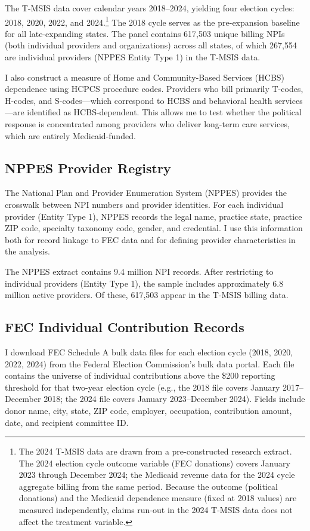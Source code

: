 \documentclass[12pt]{article}
\begin{document}
The T-MSIS data cover calendar years 2018--2024, yielding four election cycles: 2018, 2020, 2022, and 2024.\footnote{The 2024 T-MSIS data are drawn from a pre-constructed research extract. The 2024 election cycle outcome variable (FEC donations) covers January 2023 through December 2024; the Medicaid revenue data for the 2024 cycle aggregate billing from the same period. Because the outcome (political donations) and the Medicaid dependence measure (fixed at 2018 values) are measured independently, claims run-out in the 2024 T-MSIS data does not affect the treatment variable.} The 2018 cycle serves as the pre-expansion baseline for all late-expanding states. The panel contains 617,503 unique billing NPIs (both individual providers and organizations) across all states, of which 267,554 are individual providers (NPPES Entity Type 1) in the T-MSIS data.

I also construct a measure of Home and Community-Based Services (HCBS) dependence using HCPCS procedure codes. Providers who bill primarily T-codes, H-codes, and S-codes---which correspond to HCBS and behavioral health services---are identified as HCBS-dependent. This allows me to test whether the political response is concentrated among providers who deliver long-term care services, which are entirely Medicaid-funded.

\subsection{NPPES Provider Registry}

The National Plan and Provider Enumeration System (NPPES) provides the crosswalk between NPI numbers and provider identities. For each individual provider (Entity Type 1), NPPES records the legal name, practice state, practice ZIP code, specialty taxonomy code, gender, and credential. I use this information both for record linkage to FEC data and for defining provider characteristics in the analysis.

The NPPES extract contains 9.4 million NPI records. After restricting to individual providers (Entity Type 1), the sample includes approximately 6.8 million active providers. Of these, 617,503 appear in the T-MSIS billing data.

\subsection{FEC Individual Contribution Records}

I download FEC Schedule A bulk data files for each election cycle (2018, 2020, 2022, 2024) from the Federal Election Commission's bulk data portal. Each file contains the universe of individual contributions above the \$200 reporting threshold for that two-year election cycle (e.g., the 2018 file covers January 2017--December 2018; the 2024 file covers January 2023--December 2024). Fields include donor name, city, state, ZIP code, employer, occupation, contribution amount, date, and recipient committee ID.
\end{document}

